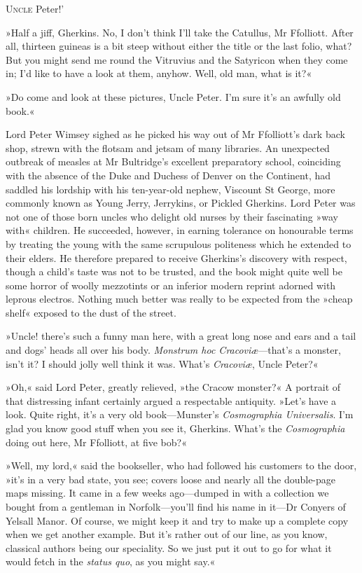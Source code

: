 
\lettrine[lines=4,ante=‘]{U}{ncle} Peter!'

\zz
»Half a jiff, Gherkins. No, I don't think I'll take the Catullus, Mr Ffolliott. After all, thirteen guineas is a bit steep without either the title or the last folio, what? But you might send me round the Vitruvius and the Satyricon when they come in; I'd like to have a look at them, anyhow. Well, old man, what is it?«

»Do come and look at these pictures, Uncle Peter. I'm sure it's an awfully old book.«

Lord Peter Wimsey sighed as he picked his way out of Mr Ffolliott's dark back shop, strewn with the flotsam and jetsam of many libraries. An unexpected outbreak of measles at Mr Bultridge's excellent preparatory school, coinciding with the absence of the Duke and Duchess of Denver on the Continent, had saddled his lordship with his ten-year-old nephew, Viscount St George, more commonly known as Young Jerry, Jerrykins, or Pickled Gherkins. Lord Peter was not one of those born uncles who delight old nurses by their fascinating »way with« children. He succeeded, however, in earning tolerance on honourable terms by treating the young with the same scrupulous politeness which he extended to their elders. He therefore prepared to receive Gherkins's discovery with respect, though a child's taste was not to be trusted, and the book might quite well be some horror of woolly mezzotints or an inferior modern reprint adorned with leprous electros. Nothing much better was really to be expected from the »cheap shelf« exposed to the dust of the street.

»Uncle! there's such a funny man here, with a great long nose and ears and a tail and dogs' heads all over his body. \textit{Monstrum hoc Cracoviæ}—that's a monster, isn't it? I should jolly well think it was. What's \textit{Cracoviæ}, Uncle Peter?«

»Oh,« said Lord Peter, greatly relieved, »the Cracow monster?« A portrait of that distressing infant certainly argued a respectable antiquity. »Let's have a look. Quite right, it's a very old book—Munster's \textit{Cosmographia Universalis}. I'm glad you know good stuff when you see it, Gherkins. What's the \textit{Cosmographia} doing out here, Mr Ffolliott, at five bob?«

»Well, my lord,« said the bookseller, who had followed his customers to the door, »it's in a very bad state, you see; covers loose and nearly all the double-page maps missing. It came in a few weeks ago—dumped in with a collection we bought from a gentleman in Norfolk—you'll find his name in it—Dr Conyers of Yelsall Manor. Of course, we might keep it and try to make up a complete copy when we get another example. But it's rather out of our line, as you know, classical authors being our speciality. So we just put it out to go for what it would fetch in the \textit{status quo}, as you might say.«

